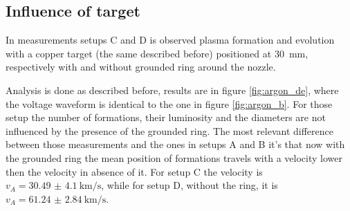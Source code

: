 \subsection{Influence of target}
In measurements setups C and D is observed plasma formation and evolution with a copper target (the same described before) positioned at \SI{30}{\milli\meter}, respectively with and without grounded ring around the nozzle.

Analysis is done as described before, results are in figure \ref{fig:argon_de}, where the voltage waveform is identical to the one in figure \ref{fig:argon_b}.
For those setup the number of formations, their luminosity and the diameters are not influenced by the presence of the grounded ring.
The most relevant difference between those measurements and the ones in setups A and B it's that now with the grounded ring the mean position of formations travels with a velocity lower then the velocity in absence of it. For setup C the velocity is $v_A = \SI{30.49(410)}{\kilo\meter/\second}$, while for setup D, without the ring, it is $v_A = \SI{61.24(284)}{\kilo\meter/\second}$.

